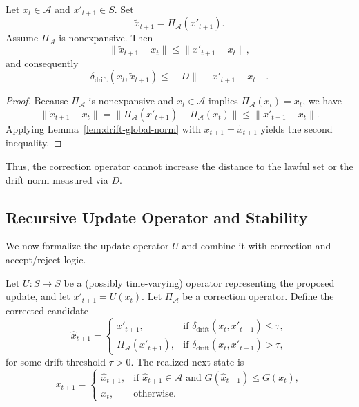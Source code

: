 \documentclass[11pt]{article}
\begin{document}
\begin{lemma}
\label{lem:drift-after-projection}
Let \(x_t \in \mathcal{A}\) and \(x'_{t+1} \in S\). Set
\[
  \tilde{x}_{t+1} = \Pi_{\mathcal{A}}(x'_{t+1}).
\]
Assume \(\Pi_{\mathcal{A}}\) is nonexpansive. Then
\[
  \|\tilde{x}_{t+1} - x_t\|
  \le
  \|x'_{t+1} - x_t\|,
\]
and consequently
\[
  \delta_{\mathrm{drift}}(x_t, \tilde{x}_{t+1})
  \le
  \|D\|\;\|x'_{t+1} - x_t\|.
\]
\end{lemma}

\begin{proof}
Because \(\Pi_{\mathcal{A}}\) is nonexpansive and \(x_t \in \mathcal{A}\) implies \(\Pi_{\mathcal{A}}(x_t) = x_t\), we have
\[
  \|\tilde{x}_{t+1} - x_t\|
  =
  \|\Pi_{\mathcal{A}}(x'_{t+1}) - \Pi_{\mathcal{A}}(x_t)\|
  \le
  \|x'_{t+1} - x_t\|.
\]
Applying Lemma~\ref{lem:drift-global-norm} with \(x_{t+1} = \tilde{x}_{t+1}\) yields the second inequality.
\end{proof}

Thus, the correction operator cannot increase the distance to the lawful set or the drift norm measured via \(D\).

\subsection{Recursive Update Operator and Stability}

We now formalize the update operator \(U\) and combine it with correction and accept/reject logic.

\begin{definition}
Let \(U : S \to S\) be a (possibly time-varying) operator representing the proposed update, and let \(x'_{t+1} = U(x_t)\).%
Let \(\Pi_{\mathcal{A}}\) be a correction operator. Define the corrected candidate
\[
  \hat{x}_{t+1} =
  \begin{cases}
    x'_{t+1}, & \text{if } \delta_{\mathrm{drift}}(x_t, x'_{t+1}) \le \tau,\\
    \Pi_{\mathcal{A}}(x'_{t+1}), & \text{if } \delta_{\mathrm{drift}}(x_t, x'_{t+1}) > \tau,
  \end{cases}
\]
for some drift threshold \(\tau > 0\). The realized next state is
\[
  x_{t+1} =
  \begin{cases}
    \hat{x}_{t+1}, & \text{if } \hat{x}_{t+1} \in \mathcal{A} \text{ and } G(\hat{x}_{t+1}) \le G(x_t),\\
    x_t, & \text{otherwise.}
  \end{cases}
\]
\end{definition}
\end{document}

